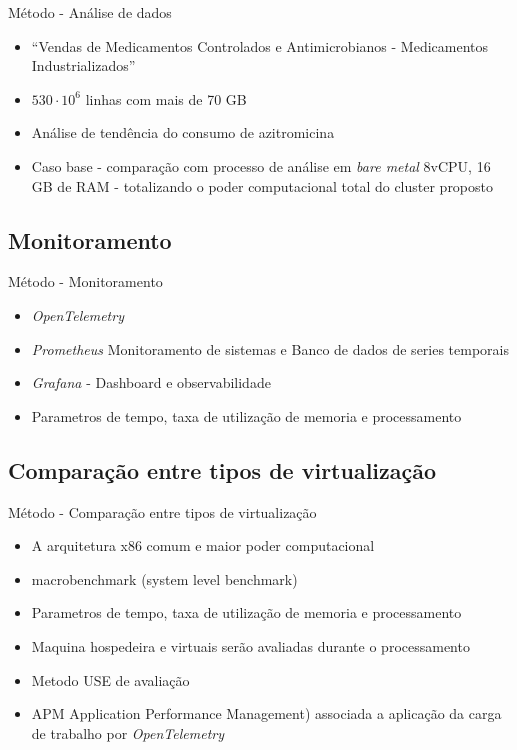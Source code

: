 \documentclass[10pt,brazil]{beamer}
\theoremstyle{definition}
\begin{document}
\begin{frame}{Método - Análise de dados}
  \begin{itemize}
    \item “Vendas de Medicamentos Controlados e Antimicrobianos - Medicamentos Industrializados”
    \item $530 \cdot 10^{6}$ linhas com mais de 70 GB
    \item Análise de tendência do consumo de azitromicina
    \item Caso base - comparação com processo de análise em \emph{bare metal} 8vCPU, 16 GB de RAM - totalizando o poder computacional total do cluster proposto
  \end{itemize}
\end{frame}

\subsection{Monitoramento}

\begin{frame}{Método - Monitoramento}
  \begin{itemize}
    \item \emph{OpenTelemetry}
    \item \emph{Prometheus} Monitoramento de sistemas e Banco de dados de series temporais
    \item \emph{Grafana} - Dashboard e observabilidade
    \item Parametros de tempo, taxa de utilização de memoria e processamento
  \end{itemize}
\end{frame}


\subsection{Comparação entre tipos de virtualização}

\begin{frame}{Método - Comparação entre tipos de virtualização}
  \begin{itemize}
    \item A arquitetura x86 comum e maior poder computacional \cite{fayyad_benchmarking_2013}
    \item macrobenchmark (system level benchmark) \cite{huge2008,scheepers2014virtualization}
    \item Parametros de tempo, taxa de utilização de memoria e processamento
    \item Maquina hospedeira e virtuais serão avaliadas durante o processamento
    \item Metodo USE de avaliação \cite{greg2022}
    \item APM Application Performance Management) associada a aplicação da carga de trabalho por \emph{OpenTelemetry} \cite{tang2021systematical}
  \end{itemize}
\end{frame}
\end{document}
